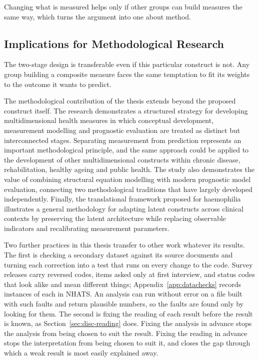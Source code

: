 Changing what is measured helps only if other groups can build measures the same
way, which turns the argument into one about method.

\subsection{Implications for Methodological Research}
\label{sec:disc-impl-method}

The two-stage design is transferable even if this particular construct is not.
Any group building a composite measure faces the same temptation to fit its
weights to the outcome it wants to predict.

The methodological contribution of the thesis extends beyond the proposed construct itself. The research demonstrates a structured strategy for developing multidimensional health measures in which conceptual development, measurement modelling and prognostic evaluation are treated as distinct but interconnected stages. Separating measurement from prediction represents an important methodological principle, and the same approach could be applied to the development of other multidimensional constructs within chronic disease, rehabilitation, healthy ageing and public health. The study also demonstrates the value of combining structural equation modelling with modern prognostic model evaluation, connecting two methodological traditions that have largely developed independently. Finally, the translational framework proposed for haemophilia illustrates a general methodology for adapting latent constructs across clinical contexts by preserving the latent architecture while replacing observable indicators and recalibrating measurement parameters.

Two further practices in this thesis transfer to other work whatever its results.
The first is checking a secondary dataset against its source documents and turning
each correction into a test that runs on every change to the code. Survey releases
carry reversed codes, items asked only at first interview, and status codes that
look alike and mean different things; Appendix~\ref{app:datachecks} records
instances of each in NHATS. An analysis can run without error on a file built with
such faults and return plausible numbers, so the faults are found only by looking
for them. The second is fixing the reading of each result before the result is
known, as Section~\ref{sec:disc-reading} does. Fixing the analysis in advance
stops the analysis from being chosen to suit the result. Fixing the reading in
advance stops the interpretation from being chosen to suit it, and closes the gap
through which a weak result is most easily explained away.

